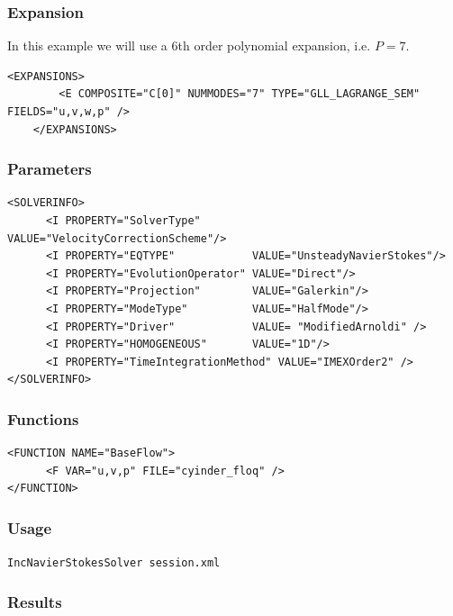 \subsubsection{Expansion}

In this example we will use a 6th order polynomial expansion, i.e. $P=7$.

 \begin{lstlisting}[style=XMLStyle]
<EXPANSIONS>
        <E COMPOSITE="C[0]" NUMMODES="7" TYPE="GLL_LAGRANGE_SEM" FIELDS="u,v,w,p" />
    </EXPANSIONS>
                                            \end{lstlisting}


\subsubsection{Parameters}

 \begin{lstlisting}[style=XMLStyle]
<SOLVERINFO>
      <I PROPERTY="SolverType"        VALUE="VelocityCorrectionScheme"/>
      <I PROPERTY="EQTYPE"            VALUE="UnsteadyNavierStokes"/>
      <I PROPERTY="EvolutionOperator" VALUE="Direct"/>
      <I PROPERTY="Projection"        VALUE="Galerkin"/>
      <I PROPERTY="ModeType"          VALUE="HalfMode"/>
      <I PROPERTY="Driver"            VALUE= "ModifiedArnoldi" />
      <I PROPERTY="HOMOGENEOUS"       VALUE="1D"/>
      <I PROPERTY="TimeIntegrationMethod" VALUE="IMEXOrder2" />
</SOLVERINFO>
                                            \end{lstlisting}


\subsubsection{Functions}

 \begin{lstlisting}[style=XMLStyle]
<FUNCTION NAME="BaseFlow">
      <F VAR="u,v,p" FILE="cyinder_floq" />
</FUNCTION>
                                            \end{lstlisting}


  \subsubsection{Usage}

\texttt{IncNavierStokesSolver session.xml}

\subsubsection{Results}

